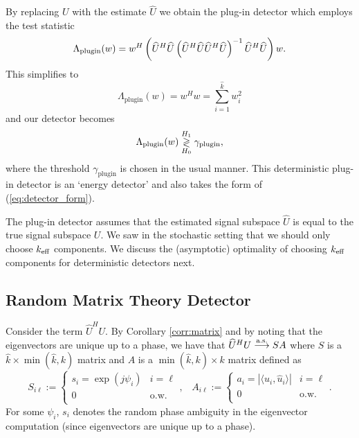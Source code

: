 By replacing $U$ with the estimate $\widehat{U}$ we obtain the plug-in detector which employs the test statistic
\begin{equation*}
\Lambda_{\text{plugin}}(w)= w^H\left(\widehat{U}^H\widehat{U}\left(\widehat{U}^H\widehat{U}\widehat{U}^H\widehat{U}\right)^{-1}\widehat{U}^H\widehat{U}\right)w.\\
\end{equation*}
This simplifies to
\begin{equation}\label{eq:plugin_stat_determ}
\boxed{\Lambda_{\text{plugin}}(w) = w^Hw=\sum_{i=1}^{\widehat{k}}w_i^2}
\end{equation}
and our detector becomes
\begin{equation}\label{eq:plugin_class_determ}
{\Lambda_{\text{plugin}}(w) \detgtrless \gamma_{\text{plugin}}},
\end{equation}
where the threshold $\gamma_{\text{plugin}}$ is chosen in the usual manner. This deterministic plug-in detector is an `energy detector' and also takes the form of (\ref{eq:detector_form}).

The plug-in detector assumes that the estimated signal subspace $\widehat{U}$ is equal to the true signal subspace $U$. We saw in the stochastic setting that we should only choose $k_\text{eff}$ components. We discuss the (asymptotic) optimality of choosing $k_\text{eff}$ components for deterministic detectors next.


\subsection{Random Matrix Theory Detector}\label{sec:optimal_determ}
\begin{comment}
Again, we hope that ideas presented in Section \ref{sec:rmt} yield insights which may avoid performance losses associated with the plug-in detector.
\end{comment}
Consider the term $\widehat{U}^HU$. By Corollary \ref{corr:matrix} and by noting that the eigenvectors are unique up to a phase, we have that $\widehat{U}^HU \overset{\textrm{a.s.}}{\longrightarrow} SA$ where $S$ is a $\widehat{k}\times\min(\widehat{k},k)$ matrix and $A$ is a $\min(\widehat{k},k)\times k$ matrix defined as
\begin{equation*}
S_{i\ell}:=\begin{cases} s_i=\exp(j\psi_i) & i=\ell \\ 0 & \text{o.w.} \\ \end{cases},\,\,\,\,\,A_{i\ell}:=\begin{cases} a_i=|\langle u_i,\widehat{u}_i\rangle| & i=\ell \\ 0 & \text{o.w.} \\ \end{cases}.
\end{equation*}
For some $\psi_{i}$, $s_i$ denotes the random phase ambiguity in the eigenvector computation (since eigenvectors are unique up to a phase).


